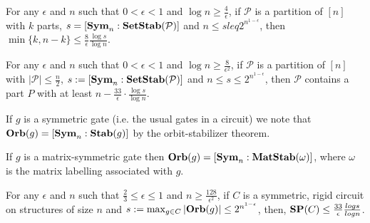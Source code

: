 \documentclass[../paper.tex]{subfiles}
\begin{document}
\begin{lem}
  \label{lem:big-or-small}
  For any $\epsilon$ and $n$ such that $0 < \epsilon < 1$ and $\log n \geq
  \frac{4}{\epsilon}$, if $\mathcal{P}$ is a partition of $[n]$ with $k$ parts,
  $s = [\text{\textbf{Sym}}_n : \text{\textbf{SetStab}} (\mathcal{P})]$ and $n \leq s leq 2^{n^{1-\epsilon}}$,
  then $\min \{k, n-k\} \leq \frac{8}{\epsilon} \frac{\log s}{\log n}$.
\end{lem}

\begin{lem}
  \label{lem:small-means-support}
  For any $\epsilon$ and $n$ such that $0 < \epsilon < 1$ and $\log n \geq
  \frac{8}{\epsilon^2}$, if $\mathcal{P}$ is a partition of $[n]$ with $\vert
  \mathcal{P} \vert \leq \frac{n}{2}$, $s:= [\text{\textbf{Sym}}_n : \text{\textbf{SetStab}} (\mathcal{P})]$
  and $n \leq s \leq 2^{n^{1-\epsilon}}$, then $\mathcal{P}$ contains a part $P$
  with at least $n - \frac{33}{\epsilon} \cdot \frac{\log s} {\log n}$.
\end{lem}

If $g$ is a symmetric gate (i.e. the usual gates in a circuit) we note that
$\text{\textbf{Orb}}(g) = [\text{\textbf{Sym}}_n : \text{\textbf{Stab}} (g)]$ by the orbit-stabilizer theorem.

If $g$ is a matrix-symmetric gate then $\text{\textbf{Orb}}(g) = [\text{\textbf{Sym}}_n:\text{\textbf{MatStab}} (\omega)]$,
where $\omega$ is the matrix labelling associated with $g$.



\begin{thm}
  \label{thm:support_thm}
  For any $\epsilon$ and $n$ such that $\frac{2}{3} \leq \epsilon \leq 1$ and $n
  \geq \frac{128}{\epsilon^2}$, if $C$ is a symmetric, rigid circuit on
  structures of size $n$ and $s := \max_{g \in C} \vert \text{\textbf{Orb}} (g)\vert \leq
  2^{n^{1-\epsilon}}$, then, $\text{\textbf{SP}}(C) \leq \frac{33}{\epsilon}\frac{log s}{log
    n}$.
\end{thm}
\end{document}
